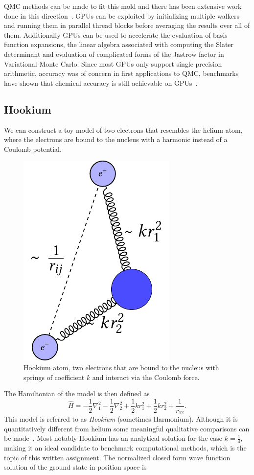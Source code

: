 \documentclass[final,3p,times,twocolumn]{elsarticle}
\begin{document}
	QMC methods can be made to fit this mold and there has been extensive work done in this direction~\cite{anderson2007quantum, meredith2009accuracy, esler2010accelerating}. GPUs can be exploited by initializing multiple walkers and running them in parallel thread blocks before averaging the results over all of them. Additionally GPUs can be used to accelerate the evaluation of basis function expansions, the linear algebra associated with computing the Slater determinant and evaluation of complicated forms of the Jastrow factor in Variational Monte Carlo. Since most GPUs only support single precision arithmetic, accuracy was of concern in first applications to QMC, benchmarks have shown that chemical accuracy is still achievable on GPUs~\cite{anderson2007quantum, meredith2009accuracy}. 
	
	
	\subsection{Hookium}
	We can construct a toy model of two electrons that resembles the helium atom, where the electrons are bound to the nucleus with a harmonic instead of a Coulomb potential. 
	\begin{figure}[h]
		\centering
		\includegraphics[width=0.35\linewidth]{../diagrams/Hookium/Hookium_diagram}
		\caption{Hookium atom, two electrons that are bound to the nucleus with springs of coefficient $k$ and interact via the Coulomb force.}
		\label{fig:Hookiumdiagram}
	\end{figure}
	The Hamiltonian of the model is then defined as 
	\begin{equation}
		\hat{H}=-\frac{1}{2} \nabla_{1}^{2}-\frac{1}{2} \nabla_{2}^{2}+\frac{1}{2} k r_{1}^{2}+\frac{1}{2} k r_{2}^{2}+\frac{1}{r_{12}}.
	\end{equation}
	This model is referred to as \emph{Hookium} (sometimes Harmonium). Although it is quantitatively different from helium some meaningful qualitative comparisons can be made~\cite{ONeill2003wave}. Most notably Hookium has an analytical solution for the case $k=\frac{1}{4}$, making it an ideal candidate to benchmark computational methods, which is the topic of this written assignment. The normalized closed form wave function solution of the ground state in position space is
\end{document}
